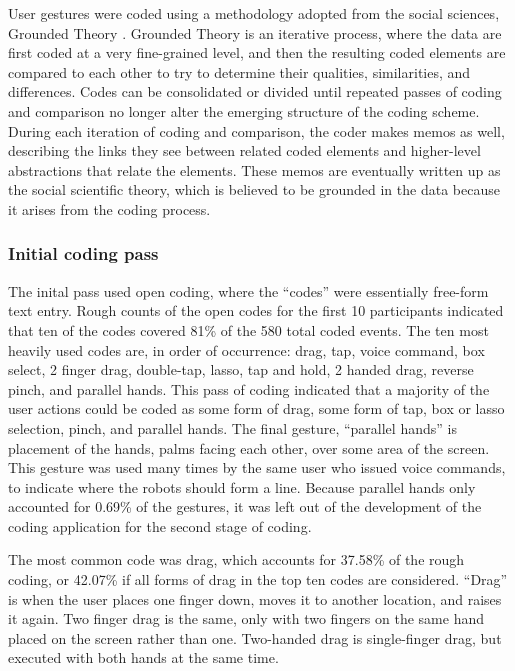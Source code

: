 User gestures were coded using a methodology adopted from the social sciences, Grounded Theory \citep{glaser2017discovery}.
Grounded Theory is an iterative process, where the data are first coded at a very fine-grained level, and then the resulting coded elements are compared to each other to try to determine their qualities, similarities, and differences. 
Codes can be consolidated or divided until repeated passes of coding and comparison no longer alter the emerging structure of the coding scheme. 
During each iteration of coding and comparison, the coder makes memos as well, describing the links they see between related coded elements and higher-level abstractions that relate the elements. 
These memos are eventually written up as the social scientific theory, which is believed to be grounded in the data because it arises from the coding process. 

\subsubsection{Initial coding pass} \label{section:Initial_coding_pass}

The inital pass used open coding, where the ``codes'' were essentially free-form text entry. 
Rough counts of the open codes for the first 10 participants indicated that ten of the codes covered 81\% of the 580 total coded events. 
The ten most heavily used codes are, in order of occurrence: drag, tap, voice command, box select, 2 finger drag, double-tap, lasso, tap and hold, 2 handed drag, reverse pinch, and parallel hands. 
This pass of coding indicated that a majority of the user actions could be coded as some form of drag, some form of tap, box or lasso selection, pinch, and parallel hands. 
The final gesture, ``parallel hands'' is placement of the hands, palms facing each other, over some area of the screen. This gesture was used many times by the same user who issued voice commands, to indicate where the robots should form a line. Because parallel hands only accounted for 0.69\% of the gestures, it was left out of the development of the coding application for the second stage of coding. 

The most common code was drag, which accounts for 37.58\% of the rough coding, or 42.07\% if all forms of drag in the top ten codes are considered. ``Drag'' is when the user places one finger down, moves it to another location, and raises it again. Two finger drag is the same, only with two fingers on the same hand placed on the screen rather than one. Two-handed drag is single-finger drag, but executed with both hands at the same time. 


